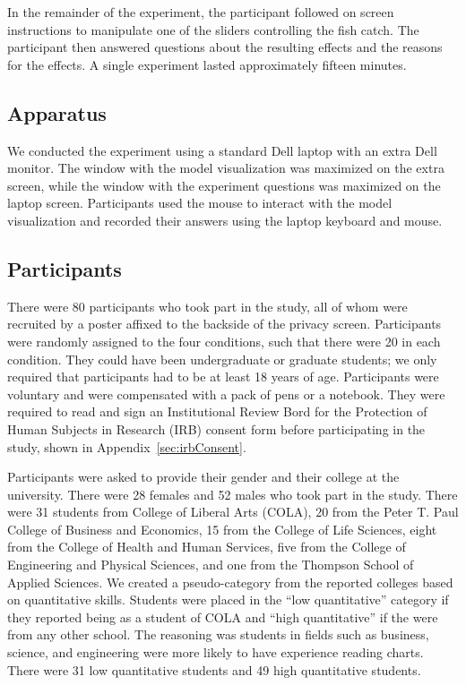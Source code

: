 In the remainder of the experiment, the participant followed on screen instructions to manipulate one of the sliders controlling the fish catch.  The participant then answered questions about the resulting effects and the reasons for the effects.  A single experiment lasted approximately fifteen minutes.

\subsection{Apparatus}

We conducted the experiment using a standard Dell laptop with an extra Dell monitor.  The window with the model visualization was maximized on the extra screen, while the window with the experiment questions was maximized on the laptop screen.  Participants used the mouse to interact with the model visualization and recorded their answers using the laptop keyboard and mouse.

\subsection{Participants} \label{sec:participants}

There were 80 participants who took part in the study, all of whom were recruited by a poster affixed to the backside of the privacy screen.  Participants were randomly assigned to the four conditions, such that there were 20 in each condition.  They could have been undergraduate or graduate students; we only required that participants had to be at least 18 years of age.  Participants were voluntary and were compensated with a pack of pens or a notebook.  They were required to read and sign an Institutional Review Bord for the Protection of Human Subjects in Research (IRB) consent form before participating in the study, shown in Appendix~\ref{sec:irbConsent}.

Participants were asked to provide their gender and their college at the university.  There were 28 females and 52 males who took part in the study.  There were 31 students from College of Liberal Arts (COLA), 20 from the Peter T. Paul College of Business and Economics, 15 from the College of Life Sciences, eight from the College of Health and Human Services, five from the College of Engineering and Physical Sciences, and one from the Thompson School of Applied Sciences.  We created a pseudo-category from the reported colleges based on quantitative skills.  Students were placed in the ``low quantitative'' category if they reported being as a student of COLA and ``high quantitative'' if the were from any other school.  The reasoning was students in fields such as business, science, and engineering were more likely to have experience reading charts.  There were 31 low quantitative students and 49 high quantitative students.

